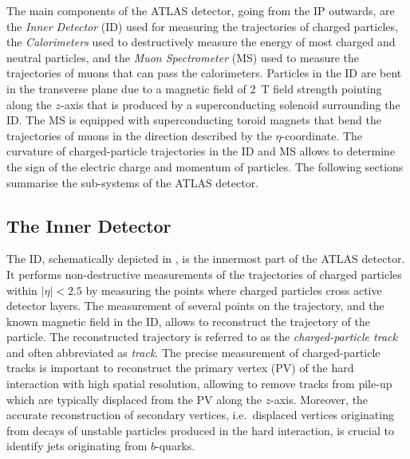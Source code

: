 The main components of the ATLAS detector, going from the IP outwards, are the
\emph{Inner Detector} (ID) used for measuring the trajectories of charged
particles, the \emph{Calorimeters} used to destructively measure the energy of
most charged and neutral particles, and the \emph{Muon Spectrometer} (MS) used
to measure the trajectories of muons that can pass the calorimeters. Particles
in the ID are bent in the transverse plane due to a magnetic field of
\SI{2}{\tesla} field strength pointing along the $z$-axis that is produced by a
superconducting solenoid surrounding the ID.  The MS is equipped with
superconducting toroid magnets that bend the trajectories of muons in the
direction described by the $\eta$-coordinate. The curvature of charged-particle
trajectories in the ID and MS allows to determine the sign of the electric
charge and momentum of particles. The following sections summarise the
sub-systems of the ATLAS detector.


\subsection{The Inner Detector}

The ID, schematically depicted in , is the
innermost part of the ATLAS detector. It performs non-destructive measurements
of the trajectories of charged particles within $|\eta| < 2.5$ by measuring the
points where charged particles cross active detector layers. The measurement of
several points on the trajectory, and the known magnetic field in the ID, allows
to reconstruct the trajectory of the particle. The reconstructed trajectory is
referred to as the \emph{charged-particle track} and often abbreviated as
\emph{track}. The precise measurement of charged-particle tracks is important to
reconstruct the primary vertex (PV) of the hard interaction with high spatial
resolution, allowing to remove tracks from pile-up which are typically displaced
from the PV along the $z$-axis. Moreover, the accurate reconstruction of
secondary vertices, i.e.\ displaced vertices originating from decays of unstable
particles produced in the hard interaction, is crucial to identify jets
originating from $b$-quarks.%


